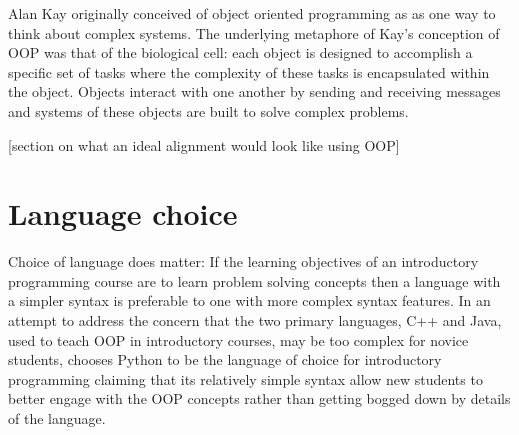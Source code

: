 \documentclass[12pt]{article}
\let\textcite=\autocite
\begin{document}
Alan Kay originally conceived of object oriented programming as as one
way to think about complex systems\autocite{kay_history_1996}. The
underlying metaphore of Kay's conception of OOP was that of the
biological cell: each object is designed to accomplish a specific set
of tasks where the complexity of these tasks is encapsulated within
the object. Objects interact with one another by sending and receiving
messages and systems of these objects are built to solve complex
problems\autocite{kay_history_1996}.


[section on what an ideal alignment would look like using OOP]

\section{Language choice}
Choice of language does matter: If the learning objectives of an
introductory programming course are to learn problem solving concepts
then a language with a simpler syntax is preferable to one with more
complex syntax features\autocite{koulouri_teaching_2014}. In an
attempt to address the concern that the two primary languages, C++ and
Java, used to teach OOP in introductory courses, may be too complex
for novice students, \textcite{goldwasser_teaching_2008} chooses
Python to be the language of choice for introductory programming
claiming that its relatively simple syntax allow new students to
better engage with the OOP concepts rather than getting bogged down by
details of the language.

\end{document}
